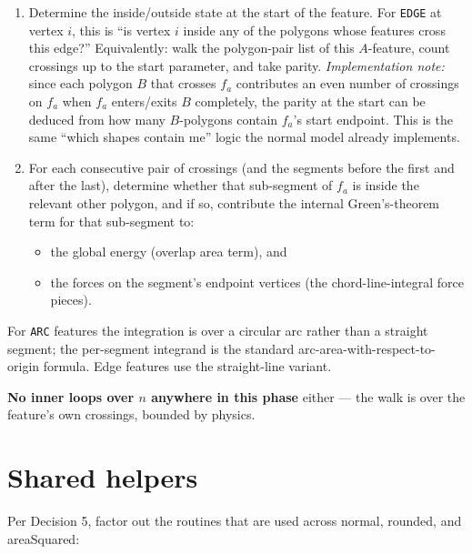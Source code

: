 \documentclass[11pt]{article}
\newcommand{\code}[1]{\texttt{#1}}
\begin{document}
\begin{enumerate}[leftmargin=*]
  \item Determine the inside/outside state at the start of the feature.
        For \code{EDGE} at vertex $i$, this is ``is vertex
        $i$ inside any of the polygons whose features cross this edge?''
        Equivalently: walk the polygon-pair list of this $A$-feature,
        count crossings up to the start parameter, and take parity.
        \emph{Implementation note:} since each polygon $B$ that
        crosses $f_a$ contributes an even number of crossings on $f_a$
        when $f_a$ enters/exits $B$ completely, the parity at the start
        can be deduced from how many $B$-polygons contain $f_a$'s start
        endpoint. This is the same ``which shapes contain me'' logic
        the normal model already implements.
  \item For each consecutive pair of crossings (and the segments
        before the first and after the last), determine whether that
        sub-segment of $f_a$ is inside the relevant other polygon, and
        if so, contribute the internal Green's-theorem term for that
        sub-segment to:
        \begin{itemize}
          \item the global energy (overlap area term), and
          \item the forces on the segment's endpoint vertices
                (the chord-line-integral force pieces).
        \end{itemize}
\end{enumerate}

For \code{ARC} features the integration is over a circular arc rather
than a straight segment; the per-segment integrand is the standard
arc-area-with-respect-to-origin formula. Edge features use the
straight-line variant.

\textbf{No inner loops over $n$ anywhere in this phase} either ---
the walk is over the feature's own crossings, bounded by physics.

\section{Shared helpers}\label{sec:helpers}

Per Decision 5, factor out the routines that are used across normal,
rounded, and areaSquared:
\end{document}

